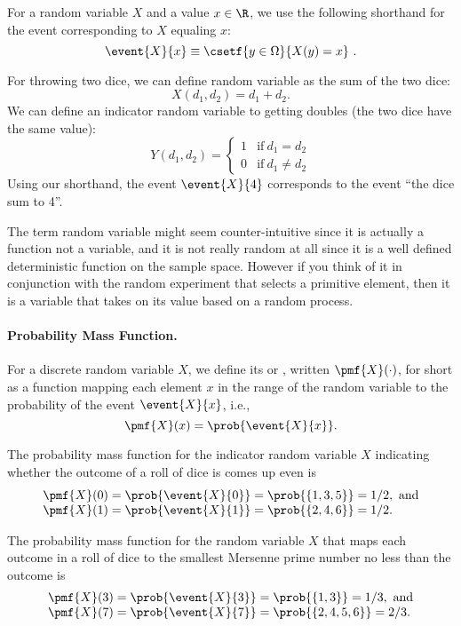 {For a random variable $X$ and a value $x \in \R$, we use the following
shorthand for the event corresponding to $X$ equaling $x$:
\[\event{X}{x} \equiv \csetf{y \in \SSpace}{X(y)  = x}~.\]


\begin{example}
For throwing two dice, we can define random variable as the sum of
the two dice:
\[
X(d_1,d_2) = d_1+d_2.
\]
We can define an indicator random variable
to getting doubles (the two dice have the same value):
\[
Y(d_1,d_2) =
\left\{
\begin{array}{ll}
1 & \mbox{if}~d_1 = d_2
\\
0 & \mbox{if}~d_1 \not= d_2
\end{array}
\right.
\]
Using our shorthand, the event $\event{X}{4}$ corresponds
to the event ``the dice sum to 4''.
\label{ex:rand::randvar}
\end{example}

\begin{remark}
The term random variable might seem counter-intuitive
since it is actually a function not a variable, and it is not really
random at all since it is a well defined deterministic function on the
sample space.  However if you think of it in conjunction with the
random experiment that selects a primitive element, then it is a
variable that takes on its value based on a random process.
\end{remark}

\paragraph{Probability Mass Function.}

For a discrete random variable $X$, we define its  or , written $\pmf{X}(\cdot)$, for short as
a function mapping each element $x$ in the range of the random
variable to the probability of the event $\event{X}{x}$, i.e.,
\[
\pmf{X}(x) = \prob{\event{X}{x}}.
\]

\begin{example}
The probability mass function for the indicator random variable $X$
indicating whether the outcome of a roll of dice is comes up even is 
\[
\begin{array}{lll}
\pmf{X}(0) = \prob{\event{X}{0}} = \prob{\{1, 3, 5\}} =
1/2,~\mbox{and}
\\
\pmf{X}(1) = \prob{\event{X}{1}} = \prob{\{2, 4, 6\}} =
1/2.
\end{array}
\]

The probability mass function for the random variable $X$
that maps each outcome in a roll of dice to the smallest Mersenne
prime number no less than the outcome is
\[
\begin{array}{lll}
\pmf{X}(3) = \prob{\event{X}{3}} = \prob{\{1, 3\}} =
1/3,~\mbox{and}
\\
\pmf{X}(7) = \prob{\event{X}{7}} = \prob{\{2, 4, 5, 6\}} =
2/3.
\end{array}
\]
\end{example}

}

